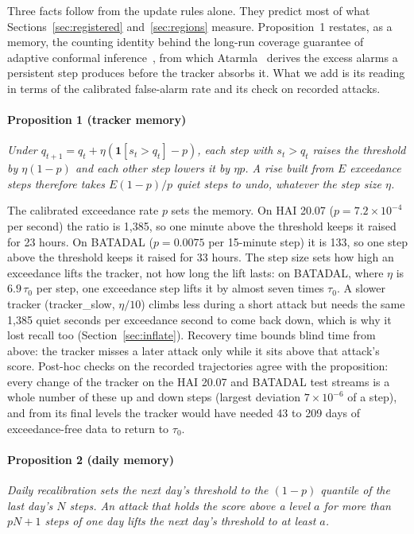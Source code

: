 \documentclass[sigconf,review,anonymous]{acmart}
\begin{document}
Three facts follow from the update rules alone. They predict most of what
Sections~\ref{sec:registered} and~\ref{sec:regions} measure. Proposition~1 restates, as a
memory, the counting identity behind the long-run coverage guarantee of adaptive conformal
inference~\cite{gibbs2021aci}, from which Atarmla~\cite{atarmla2026price} derives the excess alarms a
persistent step produces before the tracker absorbs it. What we add is its reading in terms of the
calibrated false-alarm rate and its check on recorded attacks.

\paragraph{Proposition 1 (tracker memory)} \emph{Under $q_{t+1} = q_t + \eta(\mathbf{1}[s_t > q_t]
- p)$, each step with $s_t > q_t$ raises the threshold by $\eta(1-p)$ and each other step lowers it
by $\eta p$. A rise built from $E$ exceedance steps therefore takes $E(1-p)/p$ quiet steps to undo,
whatever the step size $\eta$.}

The calibrated exceedance rate $p$ sets the memory. On HAI 20.07 ($p = 7.2 \times 10^{-4}$ per
second) the ratio is 1,385, so one minute above the threshold keeps it raised for 23 hours. On
BATADAL ($p = 0.0075$ per 15-minute step) it is 133, so one step above the threshold keeps it raised
for 33 hours. The step size sets how high an exceedance lifts the tracker, not how long the lift
lasts: on BATADAL, where $\eta$ is $6.9\,\tau_0$ per step, one exceedance step lifts it by almost seven
times $\tau_0$. A slower tracker (tracker\_slow, $\eta/10$) climbs less during a short attack but needs
the same 1,385 quiet seconds per exceedance second to come back down, which is why it lost recall too
(Section~\ref{sec:inflate}). Recovery time bounds blind time from above: the tracker misses a later
attack only while it sits above that attack's score. Post-hoc checks on the recorded trajectories
agree with the proposition: every change of the tracker on the HAI 20.07 and BATADAL test streams is
a whole number of these up and down steps (largest deviation $7 \times 10^{-6}$ of a step), and from its final levels the tracker would have needed 43 to 209 days of exceedance-free data to return
to $\tau_0$.

\paragraph{Proposition 2 (daily memory)} \emph{Daily recalibration sets the next day's threshold to
the $(1-p)$ quantile of the last day's $N$ steps. An attack that holds the score above a level $a$
for more than $pN + 1$ steps of one day lifts the next day's threshold to at least $a$.}
\end{document}
